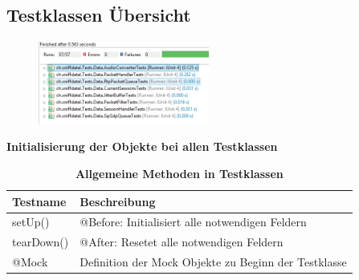 \documentclass[a4,12pt]{scrartcl}
\begin{document}
\subsection{Testklassen Übersicht}
\begin{figure} [H]
	\begin{center}
	\includegraphics[width=0.50\textwidth]{./pictures/TestsComplete.png}
	\label{Bild Referenz}
	\end{center}
\end{figure}
\textbf{Initialisierung der Objekte bei allen Testklassen}
\begin{table}[H]
\centering
    \begin{tabular}{@{} p{3.5cm} p{10cm} @{}}\toprule    
    {Testname} & {Beschreibung}\\ \midrule
    setUp() & @Before: Initialisiert alle notwendigen Feldern\\ \addlinespace
   	tearDown() & @After: Resetet alle notwendigen Feldern\\ \addlinespace
   	@Mock & Definition der Mock Objekte zu Beginn der Testklasse \\
    \bottomrule
    \end{tabular}
\caption{\textbf{Allgemeine Methoden in Testklassen}}
\end{table}
\newpage
\end{document}
